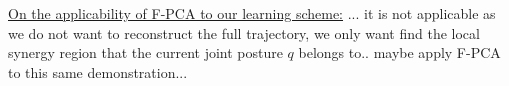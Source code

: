 \documentclass{article}
\begin{document}
\noindent \underline{On the applicability of F-PCA to our learning scheme:} ... it is not applicable as we do not want to reconstruct the full trajectory, we only want find the local synergy region that the current joint posture $q$ belongs to.. maybe apply F-PCA to this same demonstration...



\end{document}
